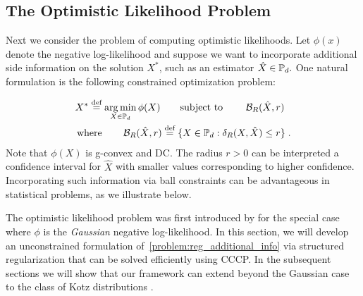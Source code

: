 \documentclass[sn-nature]{sn-jnl}%
\theoremstyle{thmstyleone}%
\theoremstyle{thmstyletwo}%
\theoremstyle{thmstylethree}%
\begin{document}
\subsection{The Optimistic Likelihood Problem}\label{section:optimisic_likelihood_problem}
Next we consider the problem of computing optimistic likelihoods.
Let $\phi(x)$ denote the negative log-likelihood and suppose we want to incorporate additional side information on the solution $X^*$, such as an estimator $\hat{X} \in \mathbb{P}_d.$ One natural formulation is the following constrained optimization problem:

\begin{equation}\label{problem:reg_additional_info}
    \begin{aligned}
        &X^* \stackrel{\text{def}}{=} \operatorname*{arg\,min}_{X \in \mathbb{P}_d} \phi(X) \qquad \text{subject to } \qquad \mathcal{B}_R(\hat{X}, r) 
        \\& \operatorname{where} \qquad \mathcal{B}_R(\hat{X}, r) \stackrel{\text{def}}{=} \{X \in \mathbb{P}_d : \delta_R(X, \hat{X}) \leq r\} \; .
    \end{aligned}
\end{equation}
Note that $\phi(X)$ is g-convex and DC. The radius $r > 0$ can be interpreted a confidence interval for $\hat{X}$ with smaller values corresponding to higher confidence.
Incorporating such information via ball constraints can be advantageous in statistical problems, as we illustrate below.

The optimistic likelihood problem was first introduced by \cite{Nguyen2019CalculatingOL} for the special case where $\phi$ is the \emph{Gaussian} negative log-likelihood. In this section, we will develop an unconstrained formulation of~\eqref{problem:reg_additional_info} via structured regularization that can be solved efficiently using CCCP. 
In the subsequent sections we will show that our framework can extend beyond the Gaussian case to the class of Kotz distributions \cite{Fang2018}.
\end{document}
